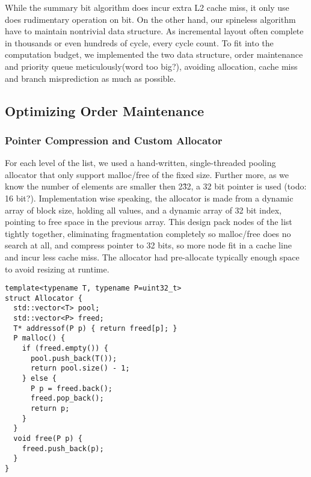 \documentclass[format=acmsmall, review=false, screen=true]{acmart}
\begin{document}
While the summary bit algorithm does incur extra L2 cache miss, it only use does rudimentary operation on bit. On the other hand, our spineless algorithm have to maintain nontrivial data structure. As incremental layout often complete in thousands or even hundreds of cycle, every cycle count. To fit into the computation budget, we implemented the two data structure, order maintenance and priority queue meticulously(word too big?), avoiding allocation, cache miss and branch misprediction as much as possible.
\subsection{Optimizing Order Maintenance}
\subsubsection{Pointer Compression and Custom Allocator}
For each level of the list, we used a hand-written, single-threaded pooling allocator that only support malloc/free of the fixed size. Further more, as we know the number of elements are smaller then 2\^32, a 32 bit pointer is used (todo: 16 bit?). Implementation wise speaking, the allocator is made from a dynamic array of block size, holding all values, and a dynamic array of 32 bit index, pointing to free space in the previous array. This design pack nodes of the list tightly together, eliminating fragmentation completely so malloc/free does no search at all, and compress pointer to 32 bits, so more node fit in a cache line and incur less cache miss. The allocator had pre-allocate typically enough space to avoid resizing at runtime.
\begin{verbatim}
template<typename T, typename P=uint32_t>
struct Allocator {
  std::vector<T> pool;
  std::vector<P> freed;
  T* addressof(P p) { return freed[p]; }
  P malloc() { 
  	if (freed.empty()) {
  	  pool.push_back(T());
  	  return pool.size() - 1;
  	} else {
  	  P p = freed.back();
  	  freed.pop_back();
  	  return p;
  	}
  }
  void free(P p) {
  	freed.push_back(p);
  }
}
\end{verbatim}
\end{document}
